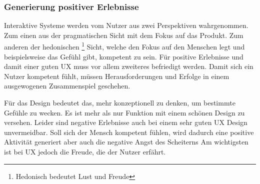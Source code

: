 \subsubsection*{Generierung positiver Erlebnisse}
Interaktive Systeme werden vom Nutzer aus zwei Perspektiven wahrgenommen. Zum einen aus der pragmatischen Sicht mit dem Fokus auf das Produkt. Zum anderen der hedonischen \footnote{Hedonisch bedeutet Lust und Freude} Sicht, welche den Fokus auf den Menschen legt und beispielsweise das Gefühl gibt, kompetent zu sein. Für positive Erlebnisse und damit einer guten UX muss vor allem zweiteres befriedigt werden. Damit sich ein Nutzer kompetent fühlt, müssen Herausforderungen und Erfolge in einem ausgewogenen Zusammenspiel geschehen. \cite{Hassenzahl2008}

Für das Design bedeutet das, mehr konzeptionell zu denken, um bestimmte Gefühle zu wecken. Es ist mehr als nur Funktion mit einem schönen Design zu versehen. Leider sind negative Erlebnisse auch bei einem sehr guten UX Design unvermeidbar. Soll sich der Mensch kompetent fühlen, wird dadurch eine positive Aktivität generiert aber auch die negative Angst des Scheiterns Am wichtigsten ist bei UX jedoch die Freude, die der Nutzer erfährt. \cite{Hassenzahl2008}

